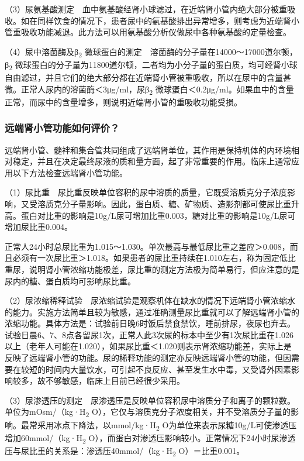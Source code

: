 （3）尿氨基酸测定　血中氨基酸经肾小球滤过，在近端肾小管内绝大部分被重吸收。如在同样饮食的情况下，患者尿中的氨基酸排出异常增多，则考虑为近端肾小管重吸收功能减退。此方法可以用氨基酸分析仪做尿中各种氨基酸的定量检查。

（4）尿中溶菌酶及β\textsubscript{2}
微球蛋白的测定　溶菌酶的分子量在14000～17000道尔顿，β\textsubscript{2}
微球蛋白的分子量为11800道尔顿，二者均为小分子量的蛋白质，均可经肾小球自由滤过，并且它们的绝大部分都在近端肾小管被重吸收，所以在尿中的含量甚微。正常人尿内的溶菌酶＜3μg/ml，尿β\textsubscript{2}
微球蛋白＜0.2μg/ml。如果血中的含量正常，而尿中的含量增多，则说明近端肾小管的重吸收功能受损。

\subsubsection{远端肾小管功能如何评价？}

远端肾小管、髓袢和集合管共同组成了远端肾单位，其作用是保持机体的内环境相对稳定，并且在决定最终尿液的质和量方面，起了非常重要的作用。临床上通常应用以下方法检查远端肾小管功能。

（1）尿比重　尿比重反映单位容积的尿中溶质的质量，它既受溶质克分子浓度影响，又受溶质克分子量影响。因此，蛋白质、糖、矿物质、造影剂都可使尿比重升高。蛋白对比重的影响是10g/L尿可增加比重0.003，糖对比重的影响是10g/L尿可增加尿比重0.004。

正常人24小时总尿比重为1.015～1.030。单次最高与最低尿比重之差应＞0.008，而且必须有一次尿比重＞1.018。如果患者的尿比重持续在1.010左右，称为固定低比重尿，说明肾小管浓缩功能极差，尿比重的测定方法极为简单易行，但应注意的是尿内的糖、蛋白质均可影响尿比重。

（2）尿浓缩稀释试验　尿浓缩试验是观察机体在缺水的情况下远端肾小管浓缩水的能力。实施方法简单且较为敏感，通过准确测量尿比重就可以了解远端肾小管的浓缩功能。具体方法是：试验前日晚6时饭后禁食禁饮，睡前排尿，夜尿也弃去。试验日晨6、7、8点各留尿1次，正常人此3次尿的标本中至少有1次尿比重在1.026以上（老年人可能在1.020），如果尿比重＜1.020则表示肾浓缩功能差，实际上是反映了远端肾小管的功能。尿的稀释功能的测定亦反映远端肾小管的功能，但因需要在较短的时间内大量饮水，可引起不良反应、甚至发生水中毒，又受肾外因素影响较多，故不够敏感，临床上目前已经很少采用。

（3）尿渗透压的测定　尿渗透压是反映单位容积尿中溶质分子和离子的颗粒数。单位为mOsm/（kg·H\textsubscript{2}
O），它仅与溶质克分子浓度相关，并不受溶质分子量的影响。最常采用冰点下降法，以mmol/kg·H\textsubscript{2}
O为单位来表示尿糖10g/L可使渗透压增加60mmol/（kg·H\textsubscript{2}
O），而蛋白对渗透压影响较小。正常情况下24小时尿渗透压与尿比重的关系是：渗透压40mmol/（kg·H\textsubscript{2}
O）＝比重0.001。

